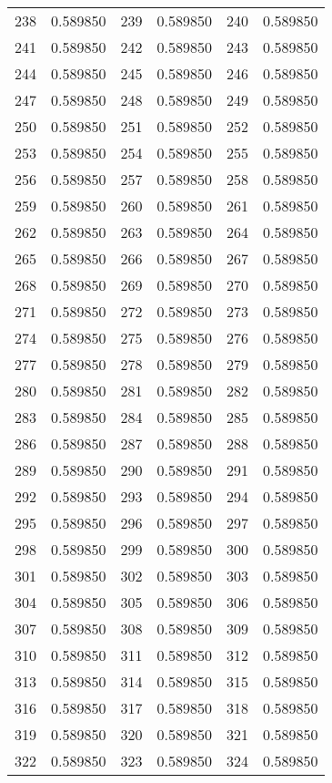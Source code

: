 \documentclass[12pt]{article}
\begin{document}
\begin{longtable}{@{}cc|cc|cc@{}}
238 & 0.589850 & 239 & 0.589850 & 240 & 0.589850 \\
241 & 0.589850 & 242 & 0.589850 & 243 & 0.589850 \\
244 & 0.589850 & 245 & 0.589850 & 246 & 0.589850 \\
247 & 0.589850 & 248 & 0.589850 & 249 & 0.589850 \\
250 & 0.589850 & 251 & 0.589850 & 252 & 0.589850 \\
253 & 0.589850 & 254 & 0.589850 & 255 & 0.589850 \\
256 & 0.589850 & 257 & 0.589850 & 258 & 0.589850 \\
259 & 0.589850 & 260 & 0.589850 & 261 & 0.589850 \\
262 & 0.589850 & 263 & 0.589850 & 264 & 0.589850 \\
265 & 0.589850 & 266 & 0.589850 & 267 & 0.589850 \\
268 & 0.589850 & 269 & 0.589850 & 270 & 0.589850 \\
271 & 0.589850 & 272 & 0.589850 & 273 & 0.589850 \\
274 & 0.589850 & 275 & 0.589850 & 276 & 0.589850 \\
277 & 0.589850 & 278 & 0.589850 & 279 & 0.589850 \\
280 & 0.589850 & 281 & 0.589850 & 282 & 0.589850 \\
283 & 0.589850 & 284 & 0.589850 & 285 & 0.589850 \\
286 & 0.589850 & 287 & 0.589850 & 288 & 0.589850 \\
289 & 0.589850 & 290 & 0.589850 & 291 & 0.589850 \\
292 & 0.589850 & 293 & 0.589850 & 294 & 0.589850 \\
295 & 0.589850 & 296 & 0.589850 & 297 & 0.589850 \\
298 & 0.589850 & 299 & 0.589850 & 300 & 0.589850 \\
301 & 0.589850 & 302 & 0.589850 & 303 & 0.589850 \\
304 & 0.589850 & 305 & 0.589850 & 306 & 0.589850 \\
307 & 0.589850 & 308 & 0.589850 & 309 & 0.589850 \\
310 & 0.589850 & 311 & 0.589850 & 312 & 0.589850 \\
313 & 0.589850 & 314 & 0.589850 & 315 & 0.589850 \\
316 & 0.589850 & 317 & 0.589850 & 318 & 0.589850 \\
319 & 0.589850 & 320 & 0.589850 & 321 & 0.589850 \\
322 & 0.589850 & 323 & 0.589850 & 324 & 0.589850 \\

\end{longtable}
\end{document}
